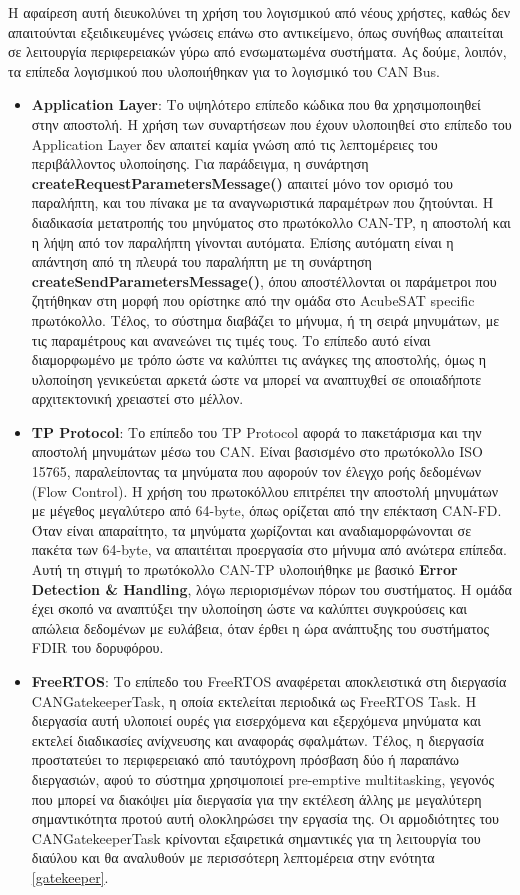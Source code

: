 \documentclass[a4paper,nobib,justified]{tufte-book}
\begin{document}
Η αφαίρεση αυτή διευκολύνει τη χρήση του λογισμικού από νέους χρήστες, καθώς δεν απαιτούνται εξειδικευμένες γνώσεις επάνω στο αντικείμενο, όπως συνήθως απαιτείται σε λειτουργία περιφερειακών γύρω από ενσωματωμένα συστήματα. Ας δούμε, λοιπόν, τα επίπεδα λογισμικού που υλοποιήθηκαν για το λογισμικό του CAN Bus.

\begin{itemize}
	\item \textbf{Application Layer}: Το υψηλότερο επίπεδο κώδικα που θα χρησιμοποιηθεί στην αποστολή. Η χρήση των συναρτήσεων που έχουν υλοποιηθεί στο επίπεδο του Application Layer δεν απαιτεί καμία γνώση από τις λεπτομέρειες του περιβάλλοντος υλοποίησης. Για παράδειγμα, η συνάρτηση \textbf{createRequestParametersMessage()} απαιτεί μόνο τον ορισμό του παραλήπτη, και του πίνακα με τα αναγνωριστικά παραμέτρων που ζητούνται. Η διαδικασία μετατροπής του μηνύματος στο πρωτόκολλο CAN-TP, η αποστολή και η λήψη από τον παραλήπτη γίνονται αυτόματα. Επίσης αυτόματη είναι η απάντηση από τη πλευρά του παραλήπτη με τη συνάρτηση \textbf{createSendParametersMessage()}, όπου αποστέλλονται οι παράμετροι που ζητήθηκαν στη μορφή που ορίστηκε από την ομάδα στο AcubeSAT specific πρωτόκολλο. Τέλος, το σύστημα διαβάζει το μήνυμα, ή τη σειρά μηνυμάτων, με τις παραμέτρους και ανανεώνει τις τιμές τους. Το επίπεδο αυτό είναι διαμορφωμένο με τρόπο ώστε να καλύπτει τις ανάγκες της αποστολής, όμως η υλοποίηση γενικεύεται αρκετά ώστε να μπορεί να αναπτυχθεί σε οποιαδήποτε αρχιτεκτονική χρειαστεί στο μέλλον.
	\item \textbf{TP Protocol}: Το επίπεδο του TP Protocol αφορά το πακετάρισμα και την αποστολή μηνυμάτων μέσω του CAN. Είναι βασισμένο στο πρωτόκολλο ISO 15765, παραλείποντας τα μηνύματα που αφορούν τον έλεγχο ροής δεδομένων (Flow Control). Η χρήση του πρωτοκόλλου επιτρέπει την αποστολή μηνυμάτων με μέγεθος μεγαλύτερο από 64-byte, όπως ορίζεται από την επέκταση CAN-FD. Όταν είναι απαραίτητο, τα μηνύματα χωρίζονται και αναδιαμορφώνονται σε πακέτα των 64-byte, να απαιτέιται προεργασία στο μήνυμα από ανώτερα επίπεδα. Αυτή τη στιγμή το πρωτόκολλο CAN-TP υλοποιήθηκε με βασικό \textbf{Error Detection \& Handling}, λόγω περιορισμένων πόρων του συστήματος. Η ομάδα έχει σκοπό να αναπτύξει την υλοποίηση ώστε να καλύπτει συγκρούσεις και απώλεια δεδομένων με ευλάβεια, όταν έρθει η ώρα ανάπτυξης του συστήματος FDIR του δορυφόρου.
	\item \textbf{FreeRTOS}: Το επίπεδο του FreeRTOS αναφέρεται αποκλειστικά στη διεργασία CANGatekeeperTask, η οποία εκτελείται περιοδικά ως FreeRTOS Task. Η διεργασία αυτή υλοποιεί ουρές για εισερχόμενα και εξερχόμενα μηνύματα και εκτελεί διαδικασίες ανίχνευσης και αναφοράς σφαλμάτων. Τέλος, η διεργασία προστατεύει το περιφερειακό από ταυτόχρονη πρόσβαση δύο ή παραπάνω διεργασιών, αφού το σύστημα χρησιμοποιεί pre-emptive multitasking, γεγονός που μπορεί να διακόψει μία διεργασία για την εκτέλεση άλλης με μεγαλύτερη σημαντικότητα προτού αυτή ολοκληρώσει την εργασία της. Οι αρμοδιότητες του CANGatekeeperTask κρίνονται εξαιρετικά σημαντικές για τη λειτουργία του διαύλου και θα αναλυθούν με περισσότερη λεπτομέρεια στην ενότητα \ref{gatekeeper}.

\end{itemize}
\end{document}
